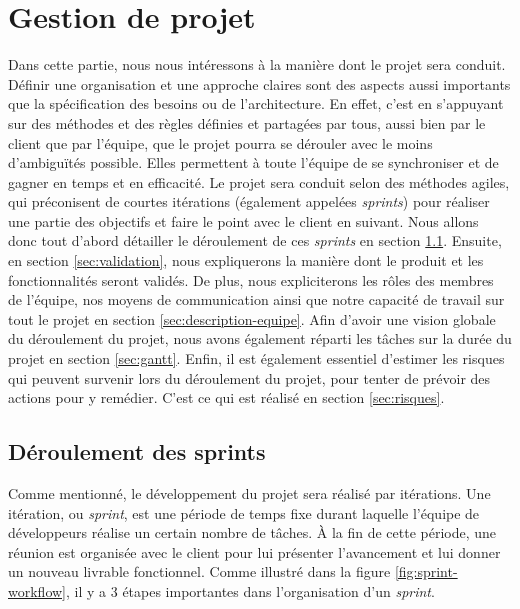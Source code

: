 \documentclass{article}
\begin{document}
\section{Gestion de projet}

Dans cette partie, nous nous intéressons à la manière dont le projet sera conduit. Définir une organisation
et une approche claires sont des aspects aussi importants que la spécification des besoins ou de l'architecture.
En effet, c'est en s'appuyant sur des méthodes et des règles définies et partagées par tous, aussi bien par le client que par l'équipe,
que le projet pourra se dérouler avec le moins d'ambiguïtés possible. Elles permettent à toute l'équipe 
de se synchroniser et de gagner en temps et en efficacité.
Le projet sera conduit selon des méthodes agiles, qui préconisent de courtes itérations (également appelées \textit{sprints})
pour réaliser une partie des objectifs et faire le point avec le client en suivant.
Nous allons donc tout d'abord détailler le déroulement de ces \textit{sprints} en section \ref{sec:sprints}.
Ensuite, en section \ref{sec:validation}, nous expliquerons la manière dont le produit et les fonctionnalités seront validés.
De plus, nous expliciterons les rôles des membres de l'équipe, nos moyens de communication ainsi que notre capacité de travail sur tout le projet
en section \ref{sec:description-equipe}. Afin d'avoir une vision globale du déroulement du projet, nous avons également réparti les tâches
sur la durée du projet en section \ref{sec:gantt}.
Enfin, il est également essentiel d'estimer les risques qui peuvent survenir lors du déroulement du projet,
pour tenter de prévoir des actions pour y remédier. C'est ce qui est réalisé en section \ref{sec:risques}.

\subsection{Déroulement des sprints}\label{sec:sprints}

Comme mentionné, le développement du projet sera réalisé par itérations. 
Une itération, ou \emph{sprint}, est une période de temps fixe durant laquelle l'équipe de développeurs réalise un certain nombre de tâches. À la fin de cette période, une réunion est organisée avec le client pour lui présenter l'avancement et lui donner un nouveau livrable fonctionnel.
Comme illustré dans la figure \ref{fig:sprint-workflow}, il y a 3 étapes importantes dans l'organisation d'un \textit{sprint}.
\end{document}
